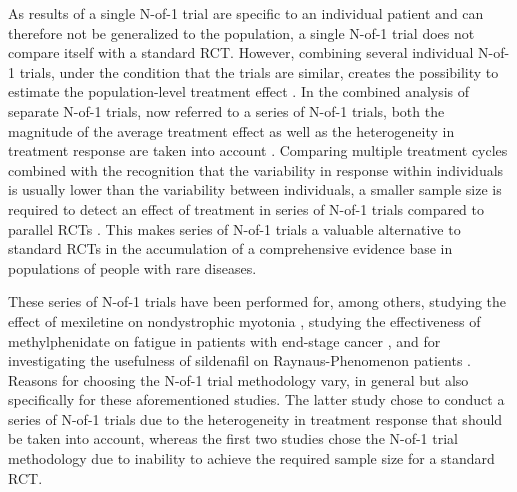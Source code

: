 \documentclass[AMA,STIX1COL,]{WileyNJD-v2}
\begin{document}
As results of a single N-of-1 trial are specific to an individual patient and can therefore not be generalized to the population, a single N-of-1 trial does not compare itself with a standard RCT. However, combining several individual N-of-1 trials, under the condition that the trials are similar, creates the possibility to estimate the population-level treatment effect \citep{zucker1997}. In the combined analysis of separate N-of-1 trials, now referred to a series of N-of-1 trials, both the magnitude of the average treatment effect as well as the heterogeneity in treatment response are taken into account \citep{zucker1997}. Comparing multiple treatment cycles combined with the recognition that the variability in response within individuals is usually lower than the variability between individuals, a smaller sample size is required to detect an effect of treatment in series of N-of-1 trials compared to parallel RCTs \citep{nikles2011}. This makes series of N-of-1 trials a valuable alternative to standard RCTs in the accumulation of a comprehensive evidence base in populations of people with rare diseases.

These series of N-of-1 trials have been performed for, among others, studying the effect of mexiletine on nondystrophic myotonia \citep{stunnenberg2018}, studying the effectiveness of methylphenidate on fatigue in patients with end-stage cancer \citep{mitchell2015}, and for investigating the usefulness of sildenafil on Raynaus-Phenomenon patients \citep{roustit2018}. Reasons for choosing the N-of-1 trial methodology vary, in general but also specifically for these aforementioned studies. The latter study chose to conduct a series of N-of-1 trials due to the heterogeneity in treatment response that should be taken into account, whereas the first two studies chose the N-of-1 trial methodology due to inability to achieve the required sample size for a standard RCT.
\end{document}
